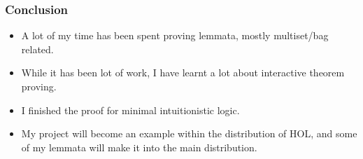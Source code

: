 \documentclass[english,svgnames,hide notes,12pt]{beamer}
\theoremstyle{definition}
\theoremstyle{remark}
\begin{document}
\begin{frame}
    \frametitle{Conclusion}
    \begin{itemize}
        \item A lot of my time has been spent proving lemmata, mostly multiset/bag related.
        \item While it has been lot of work, I have learnt a lot about interactive theorem proving.
        \item I finished the proof for minimal intuitionistic logic.
        \item My project will become an example within the distribution of HOL, and some of my lemmata will make it into the main distribution.
    \end{itemize}
\end{frame}
\end{document}
